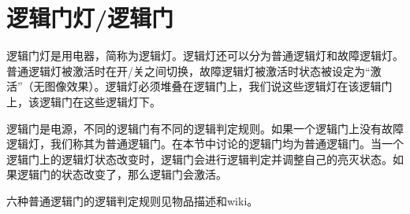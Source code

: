 \section{逻辑门灯/逻辑门}
\begin{figure}[!ht]
\centering
{}\qquad
{}
\caption{}
\end{figure}

逻辑门灯是用电器，简称为逻辑灯。逻辑灯还可以分为普通逻辑灯和故障逻辑灯。普通逻辑灯被激活时在开/关之间切换，故障逻辑灯被激活时状态被设定为“激活”（无图像效果）。逻辑灯必须堆叠在逻辑门上，我们说这些逻辑灯在该逻辑门上，该逻辑门在这些逻辑灯下。

逻辑门是电源，不同的逻辑门有不同的逻辑判定规则。如果一个逻辑门上没有故障逻辑灯，我们称其为普通逻辑门。在本节中讨论的逻辑门均为普通逻辑门。当一个逻辑门上的逻辑灯状态改变时，逻辑门会进行逻辑判定并调整自己的亮灭状态。如果逻辑门的状态改变了，那么逻辑门会激活。

六种普通逻辑门的逻辑判定规则见物品描述和wiki。

